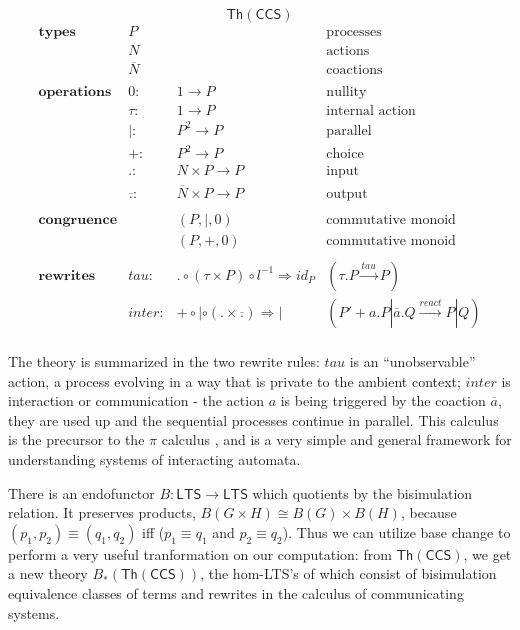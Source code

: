 \documentclass{amsart}
\theoremstyle{definition}
\newcommand{\Th}{\mathsf{Th}}
\newcommand{\maps}{\colon}
\begin{document}
\[\Th(\mathsf{CCS})\]
\[\begin{array}{lrll}
    \textbf{types} & P && \text{processes}\\
                   & N && \text{actions}\\
                   & \overline{N} && \text{coactions}\\\\
    \textbf{operations} & 0\maps & 1\to P & \text{nullity}\\
                   & \tau\maps & 1\to P & \text{internal action}\\
                   & |\maps & P^2\to P & \text{parallel}\\
                   & +\maps & P^2\to P &\text{choice}\\
                   & .\maps & N\times P\to P & \text{input}\\
                   & \overline{.}\maps & \overline{N}\times P\to P & \text{output}\\\\
    \textbf{congruence} && (P,|,0) & \text{commutative monoid}\\
                   && (P,+,0) & \text{commutative monoid}\\\\
    \textbf{rewrites} & tau\maps & .\circ (\tau\times P)\circ l^{-1} \Rightarrow id_P & (\tau.P \xrightarrow{tau} P)\\
                   & inter \maps & +\circ |\circ (.\times \overline{.}) \Rightarrow | & (P'+a.P|\overline{a}.Q \xrightarrow{react} P|Q)\\
  \end{array}\]

The theory is summarized in the two rewrite rules: $tau$ is an ``unobservable'' action, a process evolving in a way that is private to the ambient context; $inter$ is interaction or communication - the action $a$ is being triggered by the coaction $\overline{a}$, they are used up and the sequential processes continue in parallel. This calculus is the precursor to the $\pi$ calculus \cite{milner}, and is a very simple and general framework for understanding systems of interacting automata.

There is an endofunctor $B\maps \mathsf{LTS} \to \mathsf{LTS}$ which quotients by the bisimulation relation. It preserves products, $B(G\times H)\cong B(G)\times B(H)$, because $(p_1,p_2)\equiv(q_1,q_2)$ iff ($p_1\equiv q_1$ and $p_2\equiv q_2$). Thus we can utilize base change to perform a very useful tranformation on our computation: from $\Th(\mathsf{CCS})$, we get a new theory $B_*(\Th(\mathsf{CCS}))$, the hom-LTS's of which consist of bisimulation equivalence classes of terms and rewrites in the calculus of communicating systems.
\end{document}
